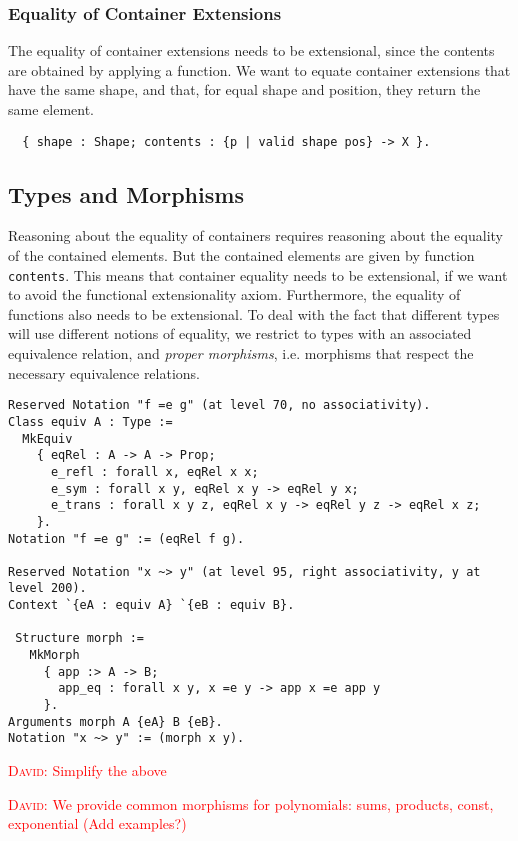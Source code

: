 \documentclass[a4paper, UKenglish, cleveref, autoref, thm-restate]{lipics-v2021}
\newcommand{\dcas}[1]{\textcolor{red}{\textsc{David}: #1}}
\begin{document}
\subsubsection{Equality of Container Extensions}

The equality of container extensions needs to be extensional, since the
contents are obtained by applying a function. We want to equate container
extensions that have the same shape, and that, for equal shape and position,
they return the same element. 
\begin{verbatim}
  { shape : Shape; contents : {p | valid shape pos} -> X }.
\end{verbatim}

\subsection{Types and Morphisms}

Reasoning about the equality of containers requires reasoning about the
equality of the contained elements. But the contained elements are given by
function \texttt{contents}. This means that container equality needs
to be extensional, if we want to avoid the functional extensionality axiom.
Furthermore, the equality of functions also needs to be extensional. To deal
with the fact that different types will use different notions of equality, we
restrict to types with an associated equivalence relation, and \emph{proper
morphisms}, i.e. morphisms that respect the necessary equivalence relations.

\begin{verbatim}
Reserved Notation "f =e g" (at level 70, no associativity).
Class equiv A : Type :=
  MkEquiv
    { eqRel : A -> A -> Prop;
      e_refl : forall x, eqRel x x;
      e_sym : forall x y, eqRel x y -> eqRel y x;
      e_trans : forall x y z, eqRel x y -> eqRel y z -> eqRel x z;
    }.
Notation "f =e g" := (eqRel f g).

Reserved Notation "x ~> y" (at level 95, right associativity, y at level 200).
Context `{eA : equiv A} `{eB : equiv B}.

 Structure morph :=
   MkMorph
     { app :> A -> B;
       app_eq : forall x y, x =e y -> app x =e app y
     }.
Arguments morph A {eA} B {eB}.
Notation "x ~> y" := (morph x y).
\end{verbatim}
\dcas{Simplify the above}

\dcas{We provide common morphisms for polynomials: sums, products, const,
exponential (Add examples?)}
\end{document}
